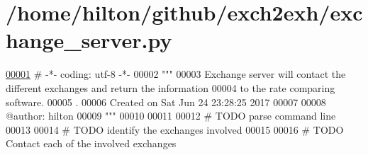 \hypertarget{exchange__server_8py_source}{}\section{/home/hilton/github/exch2exh/exchange\+\_\+server.py}

\begin{DoxyCode}
\hyperlink{namespaceexchange__server}{00001} \textcolor{comment}{# -*- coding: utf-8 -*-}
00002 \textcolor{stringliteral}{"""}
00003 \textcolor{stringliteral}{Exchange server will contact the different exchanges and return the information}
00004 \textcolor{stringliteral}{to the rate comparing software.}
00005 \textcolor{stringliteral}{.}
00006 \textcolor{stringliteral}{Created on Sat Jun 24 23:28:25 2017}
00007 \textcolor{stringliteral}{}
00008 \textcolor{stringliteral}{@author: hilton}
00009 \textcolor{stringliteral}{"""}
00010 
00011 
00012 \textcolor{comment}{# TODO parse command line}
00013 
00014 \textcolor{comment}{# TODO identify the exchanges involved }
00015 
00016 \textcolor{comment}{# TODO Contact each of the involved exchanges}
\end{DoxyCode}
